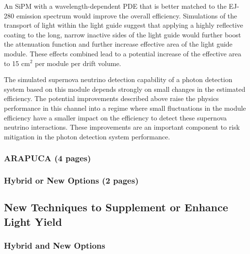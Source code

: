 An SiPM with a wavelength-dependent PDE that is better matched to the EJ-280 emission 
spectrum would improve the overall efficiency. Simulations of the transport of light 
within the light guide suggest that applying a highly reflective coating to the long, 
narrow inactive sides of the light guide would further boost the attenuation function
 and further increase effective area of the light guide module. These effects combined 
lead to a potential increase of the effective area to 15 cm$^{2}$ per module per drift volume.

The simulated supernova neutrino detection capability of a photon detection system 
based on this module depends strongly on small changes in the estimated efficiency.
 The potential improvements described above raise the physics performance in this 
channel into a regime where small fluctuations in the module efficiency have a 
smaller impact on the efficiency to detect these supernova neutrino interactions. 
These improvements are an important component to risk mitigation in the photon 
detection system performance.


\subsubsection{ARAPUCA (4 pages)}
\label{ssec:fdsp-pd-pc-arapuca}

\subsubsection{Hybrid or New Options (2 pages)}
\label{ssec:fdsp-pd-pc-new}

\subsection{New Techniques to Supplement or Enhance Light Yield}
\label{sec:fdsp-pd-enh}

\subsubsection{Hybrid and New Options}

